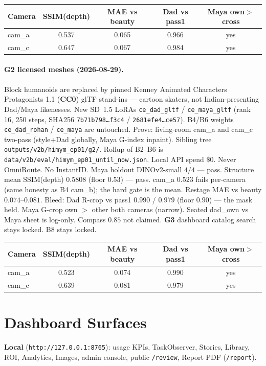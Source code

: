 \documentclass[10pt,twocolumn,letterpaper]{article}
\begin{document}
\begin{center}
\small
\begin{tabular}{lcccc}
\toprule
Camera & SSIM(depth) & MAE vs beauty & Dad vs pass1 & Maya own$>$cross \\
\midrule
cam\_a & 0.537 & 0.065 & 0.966 & yes \\
cam\_c & 0.647 & 0.067 & 0.984 & yes \\
\bottomrule
\end{tabular}
\end{center}

\paragraph{G2 licensed meshes (2026-08-29).}
Block humanoids are replaced by pinned Kenney Animated Characters Protagonists 1.1 (\textbf{CC0}) glTF stand-ins --- cartoon skaters, not Indian-presenting Dad/Maya likenesses. New SD~1.5 LoRAs \texttt{ce\_dad\_gltf} / \texttt{ce\_maya\_gltf} (rank 16, 250 steps, SHA256 \texttt{7b71b798\ldots f3c4} / \texttt{2681efe4\ldots ce57}). B4/B6 weights \texttt{ce\_dad\_rohan} / \texttt{ce\_maya} are untouched. Prove: living-room cam\_a and cam\_c two-pass (style+Dad globally, Maya G-index inpaint). Sibling tree \texttt{outputs/v2b/himym\_ep01/g2/}. Rollup of B2--B6 is \texttt{data/v2b/eval/himym\_ep01\_until\_now.json}. Local API spend \$0. Never OmniRoute. No InstantID.
Maya holdout DINOv2-small $4/4$ --- pass. Structure mean SSIM(depth) $0.5808$ (floor $0.53$) --- pass. cam\_a $0.523$ fails per-camera (same honesty as B4 cam\_b); the hard gate is the mean. Restage MAE vs beauty $0.074$--$0.081$.
Bleed: Dad R-crop vs pass1 $0.990$ / $0.979$ (floor $0.90$) --- the mask held. Maya G-crop own $>$ other both cameras (narrow). Seated dad\_own vs Maya sheet is log-only. Compass $0.85$ not claimed. \textbf{G3} dashboard catalog search stays locked. B8 stays locked.

\begin{center}
\small
\begin{tabular}{lcccc}
\toprule
Camera & SSIM(depth) & MAE vs beauty & Dad vs pass1 & Maya own$>$cross \\
\midrule
cam\_a & 0.523 & 0.074 & 0.990 & yes \\
cam\_c & 0.639 & 0.081 & 0.979 & yes \\
\bottomrule
\end{tabular}
\end{center}

\section{Dashboard Surfaces}
\textbf{Local} (\texttt{http://127.0.0.1:8765}): usage KPIs, TaskObserver, Stories, Library, ROI, Analytics, Images, admin console, public \texttt{/review}, Report PDF (\texttt{/report}).
\end{document}
